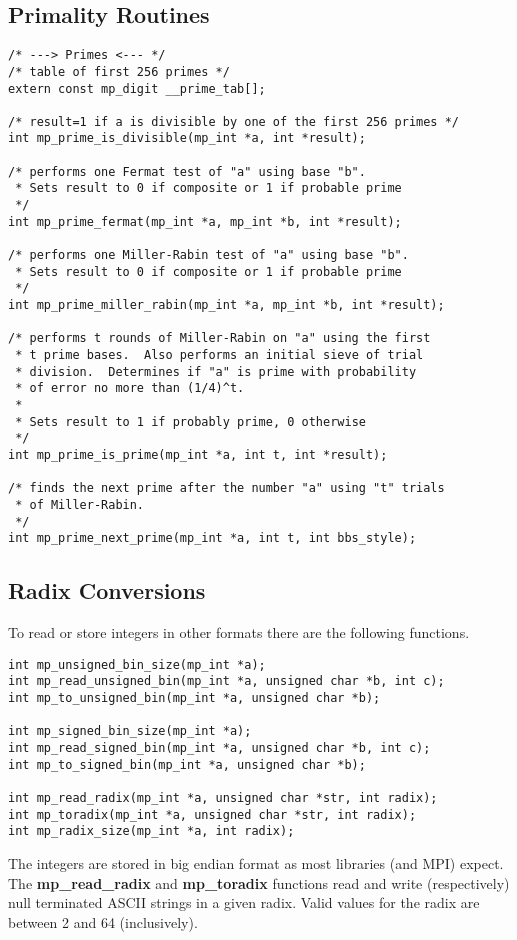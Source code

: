 \documentclass[]{article}
\begin{document}
\subsection{Primality Routines}
\begin{verbatim}
/* ---> Primes <--- */
/* table of first 256 primes */
extern const mp_digit __prime_tab[];

/* result=1 if a is divisible by one of the first 256 primes */
int mp_prime_is_divisible(mp_int *a, int *result);

/* performs one Fermat test of "a" using base "b".  
 * Sets result to 0 if composite or 1 if probable prime 
 */
int mp_prime_fermat(mp_int *a, mp_int *b, int *result);

/* performs one Miller-Rabin test of "a" using base "b".
 * Sets result to 0 if composite or 1 if probable prime 
 */
int mp_prime_miller_rabin(mp_int *a, mp_int *b, int *result);

/* performs t rounds of Miller-Rabin on "a" using the first
 * t prime bases.  Also performs an initial sieve of trial
 * division.  Determines if "a" is prime with probability
 * of error no more than (1/4)^t.
 *
 * Sets result to 1 if probably prime, 0 otherwise
 */
int mp_prime_is_prime(mp_int *a, int t, int *result);

/* finds the next prime after the number "a" using "t" trials
 * of Miller-Rabin.
 */
int mp_prime_next_prime(mp_int *a, int t, int bbs_style);
\end{verbatim}

\subsection{Radix Conversions}
To read or store integers in other formats there are the following functions.

\begin{verbatim}
int mp_unsigned_bin_size(mp_int *a);
int mp_read_unsigned_bin(mp_int *a, unsigned char *b, int c);
int mp_to_unsigned_bin(mp_int *a, unsigned char *b);

int mp_signed_bin_size(mp_int *a);
int mp_read_signed_bin(mp_int *a, unsigned char *b, int c);
int mp_to_signed_bin(mp_int *a, unsigned char *b);

int mp_read_radix(mp_int *a, unsigned char *str, int radix);
int mp_toradix(mp_int *a, unsigned char *str, int radix);
int mp_radix_size(mp_int *a, int radix);
\end{verbatim}

The integers are stored in big endian format as most libraries (and MPI) expect.  The \textbf{mp\_read\_radix} and 
\textbf{mp\_toradix} functions read and write (respectively) null terminated ASCII strings in a given radix.  Valid values
for the radix are between 2 and 64 (inclusively).  
\end{document}
